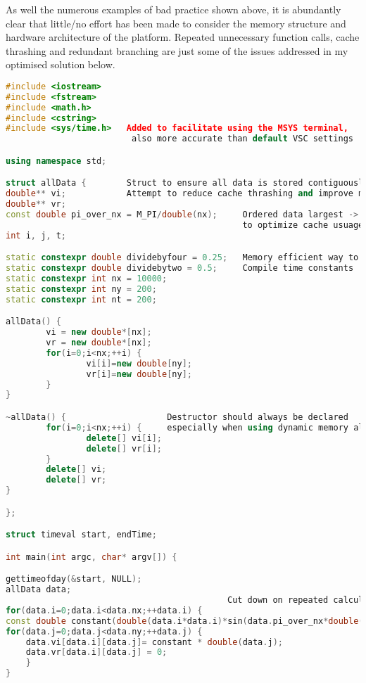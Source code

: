 \documentclass[10pt]{report}
\begin{document}
\vspace{1cm}
As well the numerous examples of bad practice shown above, it is abundantly clear that little/no effort has been made to consider the memory structure and hardware architecture of the platform. Repeated unnecessary function calls, cache thrashing and redundant branching are just some of the issues addressed in my optimised solution below.



\newpage
\begin{lstlisting}[language=C++, caption=Optimized code listing]
#include <iostream>
#include <fstream>
#include <math.h>
#include <cstring>
#include <sys/time.h>   Added to facilitate using the MSYS terminal,
                         also more accurate than default VSC settings

using namespace std;

struct allData {        Struct to ensure all data is stored contiguously in memory
double** vi;            Attempt to reduce cache thrashing and improve memory access pattern
double** vr;            
const double pi_over_nx = M_PI/double(nx);     Ordered data largest -> smallest 
                                               to optimize cache usuage
int i, j, t;                       

static constexpr double dividebyfour = 0.25;   Memory efficient way to store constants
static constexpr double dividebytwo = 0.5;     Compile time constants
static constexpr int nx = 10000;
static constexpr int ny = 200;
static constexpr int nt = 200;

allData() {
        vi = new double*[nx];       
        vr = new double*[nx];
        for(i=0;i<nx;++i) {
                vi[i]=new double[ny];                                    
                vr[i]=new double[ny];
        }
}

~allData() {                    Destructor should always be declared
        for(i=0;i<nx;++i) {     especially when using dynamic memory allocation
                delete[] vi[i];
                delete[] vr[i];
        }
        delete[] vi;
        delete[] vr;
}

};

struct timeval start, endTime;

int main(int argc, char* argv[]) {

gettimeofday(&start, NULL);
allData data;
                                            Cut down on repeated calculations
for(data.i=0;data.i<data.nx;++data.i) {
const double constant(double(data.i*data.i)*sin(data.pi_over_nx*double(data.i)));
for(data.j=0;data.j<data.ny;++data.j) {
    data.vi[data.i][data.j]= constant * double(data.j);         
    data.vr[data.i][data.j] = 0;
    }
}


\end{lstlisting}
\end{document}
